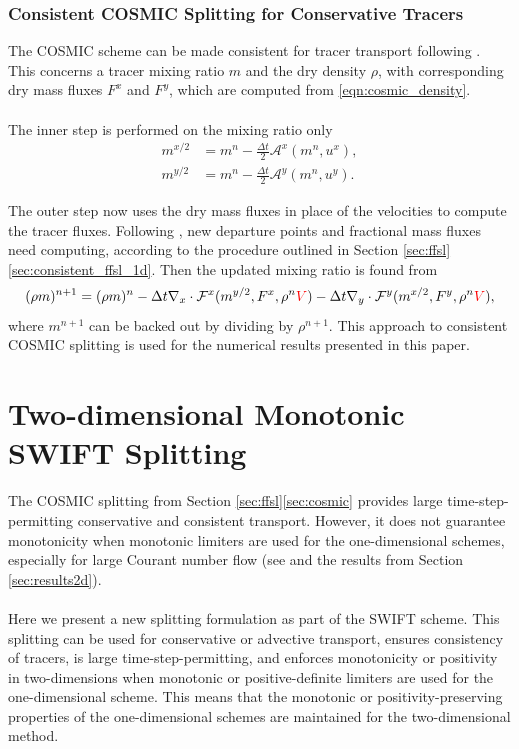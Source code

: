 \documentclass{ametsocV6.1}
\newcommand{\change}[1]{\textcolor{red}{#1}}
\begin{document}
\subsubsection{Consistent COSMIC Splitting for Conservative Tracers} \label{sec:cosmic_tracer}
The COSMIC scheme can be made consistent for tracer transport following \cite{lin1996ffsl}.
This concerns a tracer mixing ratio $m$ and the dry density $\rho$, with corresponding dry mass fluxes $F^x$ and $F^y$, which are computed from \eqref{eqn:cosmic_density}. \\ 
\\
The inner step is performed on the mixing ratio only
\begin{subequations}
\begin{align}
    m^{x/2} &= m^n - \frac{\Delta{t}}{2} \mathcal{A}^x(m^n, u^x), \\
    m^{y/2} &= m^n - \frac{\Delta{t}}{2} \mathcal{A}^y(m^n, u^y).
\end{align}
\end{subequations}

The outer step now uses the dry mass fluxes in place of the velocities to compute the tracer fluxes.
Following \citet{skamarock2006limiters}, new departure points and fractional mass fluxes need computing, according to the procedure outlined in Section \ref{sec:ffsl}\ref{sec:consistent_ffsl_1d}.
Then the updated mixing ratio is found from
\begin{equation} \label{eqn:cosmic_tracer_end}
   (\rho m)^{n+1} = (\rho m)^{n} - \Delta{t} \nabla_x\cdot \mathcal{F}^x(m^{y/2},F^x,\rho^n\change{V}) - \Delta{t} \nabla_y\cdot \mathcal{F}^y(m^{x/2},F^y,\rho^n\change{V}),
\end{equation}
where $m^{n+1}$ can be backed out by dividing by $\rho^{n+1}$. This approach to consistent COSMIC splitting is used for the numerical results presented in this paper. 


\section{Two-dimensional Monotonic SWIFT Splitting} \label{sec:swift_splitting} 

The COSMIC splitting from Section \ref{sec:ffsl}\ref{sec:cosmic} provides large time-step-permitting conservative and consistent transport. However, it does not guarantee monotonicity when monotonic limiters are used for the one-dimensional schemes, especially for large Courant number flow (see \citep{leonard1996cosmic,lin1996ffsl,bott2010improving} and the results from Section \ref{sec:results2d}). \\
\\
Here we present a new splitting formulation as part of the SWIFT scheme. This splitting can be used for conservative or advective transport, ensures consistency of tracers, is large time-step-permitting, and enforces monotonicity or positivity in two-dimensions when monotonic or positive-definite limiters are used for the one-dimensional scheme. This means that the monotonic or positivity-preserving properties of the one-dimensional schemes are maintained for the two-dimensional method. 
\end{document}
